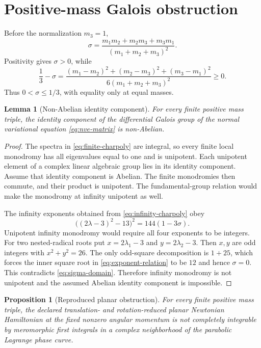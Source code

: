 \documentclass[11pt]{article}
\newtheorem{proposition}[theorem]{Proposition}
\newtheorem{lemma}[theorem]{Lemma}
\theoremstyle{definition}
\theoremstyle{remark}
\begin{document}
\section{Positive-mass Galois obstruction}
\label{sec:galois}

Before the normalization \(m_3=1\),
\[
\sigma=
\frac{m_1m_2+m_2m_3+m_3m_1}{(m_1+m_2+m_3)^2}.
\]
Positivity gives \(\sigma>0\), while
\begin{equation}
\frac13-\sigma=
\frac{(m_1-m_2)^2+(m_2-m_3)^2+(m_3-m_1)^2}
     {6(m_1+m_2+m_3)^2}\geq0.
\label{eq:sigma-domain}
\end{equation}
Thus \(0<\sigma\leq1/3\), with equality only at equal masses.

\begin{lemma}[Non-Abelian identity component]
\label{lem:nonabelian}
For every finite positive mass triple, the identity component of the
differential Galois group of the normal variational equation
\eqref{eq:nve-matrix} is non-Abelian.
\end{lemma}

\begin{proof}
The spectra in \eqref{eq:finite-charpoly} are integral, so every finite local
monodromy has all eigenvalues equal to one and is unipotent.  Each unipotent
element of a complex linear algebraic group lies in its identity component.
Assume that identity component is Abelian.  The finite monodromies then
commute, and their product is unipotent.  The fundamental-group relation
would make the monodromy at infinity unipotent as well.

The infinity exponents obtained from \eqref{eq:infinity-charpoly} obey
\begin{equation}
 \big((2\lambda-3)^2-13\big)^2=144(1-3\sigma).
\label{eq:exponent-relation}
\end{equation}
Unipotent infinity monodromy would require all four exponents to be integers.
For two nested-radical roots put \(x=2\lambda_1-3\) and
\(y=2\lambda_2-3\).  Then \(x,y\) are odd integers with
\(x^2+y^2=26\).  The only odd-square decomposition is \(1+25\), which
forces the inner square root in \eqref{eq:exponent-relation} to be \(12\)
and hence \(\sigma=0\).  This contradicts \eqref{eq:sigma-domain}.
Therefore infinity monodromy is not unipotent and the assumed Abelian
identity component is impossible.
\end{proof}

\begin{proposition}[Reproduced planar obstruction]
\label{prop:planar}
For every finite positive mass triple, the declared translation- and
rotation-reduced planar Newtonian Hamiltonian at the fixed nonzero angular
momentum is not completely integrable by meromorphic first integrals in a
complex neighborhood of the parabolic Lagrange phase curve.
\end{proposition}
\end{document}
